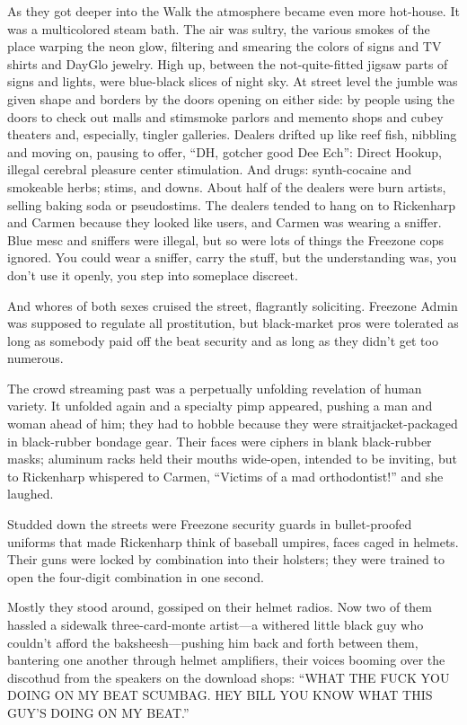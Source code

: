 As they got deeper into the Walk the atmosphere became even more hot-house. It was a multicolored steam bath. The air was sultry, the various smokes of the place warping the neon glow, filtering and smearing the colors of signs and TV shirts and DayGlo jewelry. High up, between the not-quite-fitted jigsaw parts of signs and lights, were blue-black slices of night sky. At street level the jumble was given shape and borders by the doors opening on either side: by people using the doors to check out malls and stimsmoke parlors and memento shops and cubey theaters and, especially, tingler galleries. Dealers drifted up like reef fish, nibbling and moving on, pausing to offer, “DH, gotcher good Dee Ech”: Direct Hookup, illegal cerebral pleasure center stimulation. And drugs: synth-cocaine and smokeable herbs; stims, and downs. About half of the dealers were burn artists, selling baking soda or pseudostims. The dealers tended to hang on to Rickenharp and Carmen because they looked like users, and Carmen was wearing a sniffer. Blue mesc and sniffers were illegal, but so were lots of things the Freezone cops ignored. You could wear a sniffer, carry the stuff, but the understanding was, you don’t use it openly, you step into someplace discreet.

And whores of both sexes cruised the street, flagrantly soliciting. Freezone Admin was supposed to regulate all prostitution, but black-market pros were tolerated as long as somebody paid off the beat security and as long as they didn’t get too numerous.

The crowd streaming past was a perpetually unfolding revelation of human variety. It unfolded again and a specialty pimp appeared, pushing a man and woman ahead of him; they had to hobble because they were straitjacket-packaged in black-rubber bondage gear. Their faces were ciphers in blank black-rubber masks; aluminum racks held their mouths wide-open, intended to be inviting, but to Rickenharp whispered to Carmen, “Victims of a mad orthodontist!” and she laughed.

Studded down the streets were Freezone security guards in bullet-proofed uniforms that made Rickenharp think of baseball umpires, faces caged in helmets. Their guns were locked by combination into their holsters; they were trained to open the four-digit combination in one second.

Mostly they stood around, gossiped on their helmet radios. Now two of them hassled a sidewalk three-card-monte artist—a withered little black guy who couldn’t afford the baksheesh—pushing him back and forth between them, bantering one another through helmet amplifiers, their voices booming over the discothud from the speakers on the download shops: “WHAT THE FUCK YOU DOING ON MY BEAT SCUMBAG. HEY BILL YOU KNOW WHAT THIS GUY’S DOING ON MY BEAT.”

